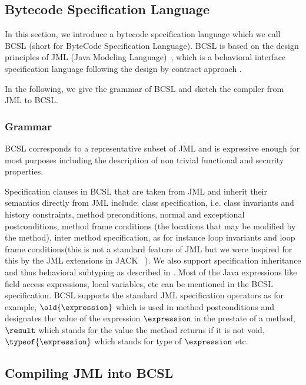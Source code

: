 \subsection{Bytecode Specification Language}\label{bcSpecLg}

In this section, we introduce a bytecode specification language which we call BCSL (short for ByteCode Specification Language).
 BCSL is based on the design principles of JML (Java Modeling Language)~\cite{JMLRefMan}, which is a behavioral interface specification 
language following the design by contract approach \cite{M97oos}.

In the following, we give the grammar of BCSL and sketch the compiler from JML to BCSL. 

\subsubsection{Grammar} \label{grammar}


BCSL corresponds to a representative subset of JML and is expressive enough for most purposes including the description of non trivial functional and security properties.


 Specification clauses in BCSL that are taken from JML and inherit their semantics directly from JML include:
class specification, i.e. class invariants and history constraints, 
  method preconditions, normal and exceptional postconditions, method frame conditions (the locations that may be modified by the method), inter method specification, as for instance loop invariants and loop frame conditions(this is not a standard feature of JML but we were inspired for this by the JML extensions in JACK ~\cite{BRL-JACK}). 
We also support specification inheritance and thus behavioral subtyping as described in \cite{Dhara-Leavens96}. Most of the Java expressions like field access expressions, local variables, etc can be mentioned in the BCSL specification.
BCSL supports the standard JML specification operators as for example, $\old{\expression}$ which is used in method postconditions and
 designates the value of the expression $\expression$ in the prestate of a method, $ \result$ which stands for the value the method
returns if it is not void,  $\typeof{\expression}$ which stands for type of $\expression$ etc.  

\subsection{Compiling JML into BCSL}\label{comJML}


